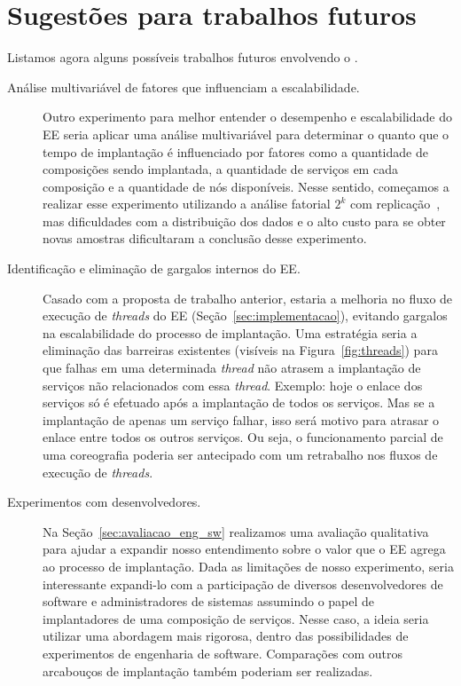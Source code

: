 \section{Sugestões para trabalhos futuros}

Listamos agora alguns possíveis trabalhos futuros envolvendo o \ee.

\begin{description}

\item[Análise multivariável de fatores que influenciam a escalabilidade.] 
Outro experimento para melhor entender o desempenho e escalabilidade do EE
seria aplicar uma análise multivariável para determinar o quanto
que o tempo de implantação é influenciado por fatores como a quantidade de composições
sendo implantada, a quantidade de serviços em cada composição e a quantidade
de nós disponíveis.
Nesse sentido, começamos a realizar esse experimento utilizando a análise fatorial $2^k$
com replicação~\cite{Jain20002kr}, mas dificuldades com a distribuição dos dados e o alto custo
para se obter novas amostras dificultaram a conclusão desse experimento.

\item[Identificação e eliminação de gargalos internos do EE.]
Casado com a proposta de trabalho anterior,
estaria a melhoria no fluxo de execução de \emph{threads} do EE 
(Seção~\ref{sec:implementacao}),
evitando gargalos na escalabilidade do processo de implantação.
Uma estratégia seria a eliminação das barreiras existentes (visíveis na Figura~\ref{fig:threads})
para que falhas em uma determinada \emph{thread} não atrasem a implantação de serviços
não relacionados com essa \emph{thread}.
Exemplo: hoje o enlace dos serviços
só é efetuado após a implantação de todos os serviços.
Mas se a implantação de apenas um serviço falhar, isso será motivo para atrasar o 
enlace entre todos os outros serviços. Ou seja, o funcionamento parcial
de uma coreografia poderia ser antecipado com um retrabalho nos fluxos
de execução de \emph{threads}.

\item[Experimentos com desenvolvedores.] 
Na Seção~\ref{sec:avaliacao_eng_sw} realizamos uma avaliação qualitativa para
ajudar a expandir nosso entendimento sobre o valor que o EE agrega ao processo de implantação.
Dada as limitações de nosso experimento, seria interessante expandi-lo
com a participação de diversos desenvolvedores de software
e administradores de sistemas assumindo o papel de implantadores de uma composição de serviços.
Nesse caso, a ideia seria utilizar uma abordagem mais rigorosa,
dentro das possibilidades de experimentos de engenharia de software.
Comparações com outros arcabouços de implantação também poderiam ser realizadas.


\end{description}
